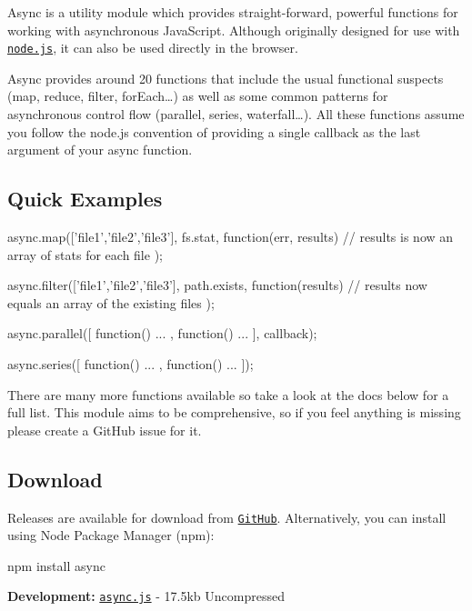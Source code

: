 Async is a utility module which provides straight-\/forward, powerful functions for working with asynchronous Java\+Script. Although originally designed for use with \href{http://nodejs.org}{\tt node.\+js}, it can also be used directly in the browser.

Async provides around 20 functions that include the usual \textquotesingle{}functional\textquotesingle{} suspects (map, reduce, filter, for\+Each…) as well as some common patterns for asynchronous control flow (parallel, series, waterfall…). All these functions assume you follow the node.\+js convention of providing a single callback as the last argument of your async function.

\subsection*{Quick Examples}

\begin{DoxyVerb}async.map(['file1','file2','file3'], fs.stat, function(err, results){
    // results is now an array of stats for each file
});

async.filter(['file1','file2','file3'], path.exists, function(results){
    // results now equals an array of the existing files
});

async.parallel([
    function(){ ... },
    function(){ ... }
], callback);

async.series([
    function(){ ... },
    function(){ ... }
]);
\end{DoxyVerb}


There are many more functions available so take a look at the docs below for a full list. This module aims to be comprehensive, so if you feel anything is missing please create a Git\+Hub issue for it.

\subsection*{Download}

Releases are available for download from \href{http://github.com/caolan/async/downloads}{\tt Git\+Hub}. Alternatively, you can install using Node Package Manager (npm)\+: \begin{DoxyVerb}npm install async
\end{DoxyVerb}


{\bfseries Development\+:} \href{https://github.com/caolan/async/raw/master/lib/async.js}{\tt async.\+js} -\/ 17.\+5kb Uncompressed

